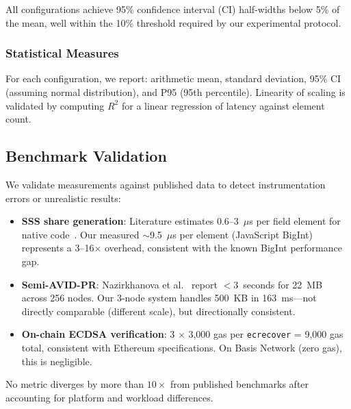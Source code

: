 All configurations achieve 95\% confidence interval (CI) half-widths below
5\% of the mean, well within the 10\% threshold required by our experimental
protocol.

\subsubsection{Statistical Measures}

For each configuration, we report: arithmetic mean, standard deviation, 95\%
CI (assuming normal distribution), and P95 (95th percentile). Linearity of
scaling is validated by computing $R^2$ for a linear regression of latency
against element count.

\subsection{Benchmark Validation}

We validate measurements against published data to detect instrumentation
errors or unrealistic results:

\begin{itemize}
\item \textbf{SSS share generation}: Literature estimates 0.6--3~$\mu$s per
  field element for native code~\cite{shamir1979share}. Our measured
  $\sim$9.5~$\mu$s per element (JavaScript BigInt) represents a 3--16$\times$
  overhead, consistent with the known BigInt performance gap.
\item \textbf{Semi-AVID-PR}: Nazirkhanova et al.~\cite{nazirkhanova2022semiavidpr}
  report $<$3~seconds for 22~MB across 256 nodes. Our 3-node system handles
  500~KB in 163~ms---not directly comparable (different scale), but
  directionally consistent.
\item \textbf{On-chain ECDSA verification}: 3 $\times$ 3,000 gas per
  \texttt{ecrecover} = 9,000 gas total, consistent with Ethereum
  specifications. On Basis Network (zero gas), this is negligible.
\end{itemize}

No metric diverges by more than $10\times$ from published benchmarks after
accounting for platform and workload differences.
